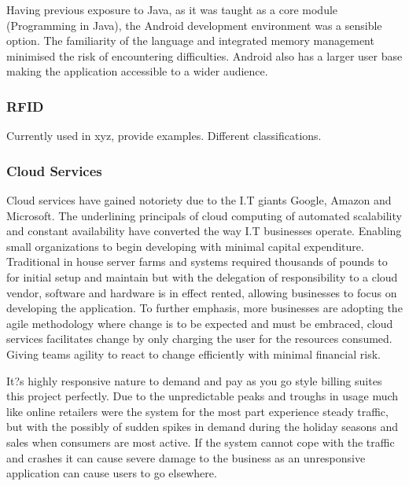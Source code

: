 \documentclass[a4paper, 11pt]{article}
\begin{document}
Having previous exposure to Java, as it was taught as a core module (Programming in Java), the Android development environment was a sensible option. The familiarity of the language and integrated memory management minimised the risk of encountering difficulties. Android also has a larger user base making the application accessible to a wider audience.

\subsubsection{RFID}

Currently used in xyz, provide examples. Different classifications. 

\subsubsection{Cloud Services} 
Cloud services have gained notoriety due to the I.T giants Google, Amazon and Microsoft. The underlining principals of cloud computing of automated scalability and constant availability have converted the way I.T businesses operate. Enabling small organizations to begin developing with minimal capital expenditure. Traditional in house server farms and systems required thousands of pounds to for initial setup and maintain but with the delegation of responsibility to a cloud vendor, software and hardware is in effect rented, allowing businesses to focus on developing the application. To further emphasis, more businesses are adopting the agile methodology where change is to be expected and must be embraced, cloud services facilitates change by only charging the user for the resources consumed. Giving teams agility to react to change efficiently with minimal financial risk.

It?s highly responsive nature to demand and pay as you go style billing suites this project perfectly. Due to the unpredictable peaks and troughs in usage much like online retailers were the system for the most part experience steady traffic, but with the possibly of sudden spikes in demand during the holiday seasons and sales when consumers are most active. If the system cannot cope with the traffic and crashes it can cause severe damage to the business as an unresponsive application can cause users to go elsewhere. 
\end{document}
